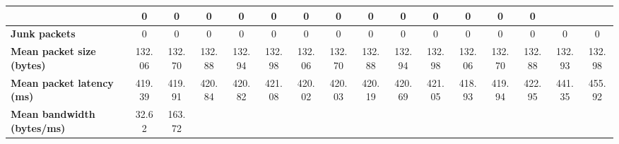 \begin{table}[!h]
{\begin{tabular}{|l|ccccc|ccccc|ccccc|}
            & \multicolumn{1}{c|}{0}
            & \multicolumn{1}{c|}{0}
            & \multicolumn{1}{c|}{0}
            & \multicolumn{1}{c|}{0}
            & \multicolumn{1}{c|}{0}
            & \multicolumn{1}{c|}{0}
            & \multicolumn{1}{c|}{0}
            & \multicolumn{1}{c|}{0}
            & \multicolumn{1}{c|}{0}
            & \multicolumn{1}{c|}{0}
            & \multicolumn{1}{c|}{0}
            & \multicolumn{1}{c|}{0}
            & \multicolumn{1}{c|}{0}
            \\ \hline
            \textbf{Junk packets} & \multicolumn{1}{c|}{0} & \multicolumn{1}{c|}{0} &
            \multicolumn{1}{c|}{0}
            & \multicolumn{1}{c|}{0}
            & \multicolumn{1}{c|}{0}
            & \multicolumn{1}{c|}{0}
            & \multicolumn{1}{c|}{0}
            & \multicolumn{1}{c|}{0}
            & \multicolumn{1}{c|}{0}
            & \multicolumn{1}{c|}{0}
            & \multicolumn{1}{c|}{0}
            & \multicolumn{1}{c|}{0}
            & \multicolumn{1}{c|}{0}
            & \multicolumn{1}{c|}{0}
            & \multicolumn{1}{c|}{0}
            \\ \hline
            \textbf{Mean packet size (bytes)} & \multicolumn{1}{c|}{132.06} & \multicolumn{1}{c|}{132.70}
            & \multicolumn{1}{c|}{132.88}
            & \multicolumn{1}{c|}{132.94}
            & \multicolumn{1}{c|}{132.98}
            & \multicolumn{1}{c|}{132.06}
            & \multicolumn{1}{c|}{132.70}
            & \multicolumn{1}{c|}{132.88}
            & \multicolumn{1}{c|}{132.94}
            & \multicolumn{1}{c|}{132.98}
            & \multicolumn{1}{c|}{132.06}
            & \multicolumn{1}{c|}{132.70}
            & \multicolumn{1}{c|}{132.88}
            & \multicolumn{1}{c|}{132.93}
            & \multicolumn{1}{c|}{132.98}
            \\ \hline
            \textbf{Mean packet latency (ms)} & \multicolumn{1}{c|}{419.39} & \multicolumn{1}{c|}{419.91}
            & \multicolumn{1}{c|}{420.84}
            & \multicolumn{1}{c|}{420.82}
            & \multicolumn{1}{c|}{421.08}
            & \multicolumn{1}{c|}{420.02}
            & \multicolumn{1}{c|}{420.03}
            & \multicolumn{1}{c|}{420.19}
            & \multicolumn{1}{c|}{420.69}
            & \multicolumn{1}{c|}{421.05}
            & \multicolumn{1}{c|}{418.93}
            & \multicolumn{1}{c|}{419.94}
            & \multicolumn{1}{c|}{422.95}
            & \multicolumn{1}{c|}{441.35}
            & \multicolumn{1}{c|}{455.92}
            \\ \hline
            \textbf{Mean bandwidth (bytes/ms)} & \multicolumn{1}{c|}{32.62} & \multicolumn{1}{c|}{163.72}

\end{tabular}}
\end{table}
